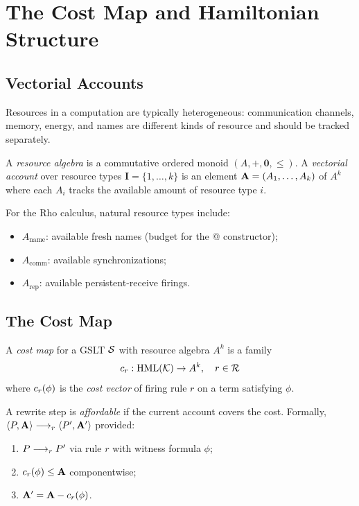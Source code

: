 \chapter{The Cost Map and Hamiltonian Structure}
\label{sec:cost}

\section{Vectorial Accounts}

Resources in a computation are typically heterogeneous: communication
channels, memory, energy, and names are different kinds of resource and should
be tracked separately.

\begin{definition}
A \emph{resource algebra} is a commutative ordered monoid
$(A, +, \mathbf{0}, \leq)$.  A \emph{vectorial account} over resource types
$\mathbf{I} = \{1, \ldots, k\}$ is an element $\mathbf{A} = (A_1, \ldots, A_k)$
of $A^k$ where each $A_i$ tracks the available amount of resource type $i$.
\end{definition}

For the Rho calculus, natural resource types include:
\begin{itemize}[itemsep=2pt]
  \item $A_{\text{name}}$: available fresh names (budget for the $@$ constructor);
  \item $A_{\text{comm}}$: available synchronizations;
  \item $A_{\text{rep}}$: available persistent-receive firings.
\end{itemize}

\section{The Cost Map}

\begin{definition}
A \emph{cost map} for a GSLT $\mathcal{S}$ with resource algebra $A^k$ is a family
\[
  c_r : \mathrm{HML}(\mathcal{K}) \to A^k, \quad r \in \mathcal{R}
\]
where $c_r(\phi)$ is the \emph{cost vector} of firing rule $r$ on a
term satisfying $\phi$.
\end{definition}

\begin{definition}
A rewrite step is \emph{affordable} if the current account covers the cost.
Formally, $\langle P, \mathbf{A} \rangle \longrightarrow_r \langle P', \mathbf{A}' \rangle$
provided:
\begin{enumerate}[label=(\roman*)]
  \item $P \longrightarrow_r P'$ via rule $r$ with witness formula $\phi$;
  \item $c_r(\phi) \leq \mathbf{A}$ componentwise;
  \item $\mathbf{A}' = \mathbf{A} - c_r(\phi)$.
\end{enumerate}
\end{definition}

